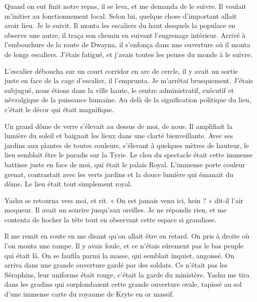 \documentclass{book}
\begin{document}
Quand on eut finit notre repas, il se leva, et me demanda de le suivre. Il voulait m'initier au fonctionnement local. Selon lui, quelque chose d'important allait avoir lieu. Je le suivit. Il monta les escaliers du haut desquels la populace en observe  une autre, il traça son chemin en suivant l'engrenage intérieur. Arrivé à l'embouchure de la route de Dwayna, il s'enfonça dans une ouverture où il monta de longs escaliers. J'étais fatigué, et j'avais toutes les peines du monde à le suivre.\newline

L'escalier déboucha sur un court corridor en arc de cercle, il y avait un sortie juste en face de la cage d'escalier, il l'emprunta. Je m'arrêtai brusquement. J'étais subjugué, nous étions dans la ville haute, le centre administratif, exécutif et névralgique de la puissance humaine. Au delà de la signification politique du lieu, c'était le décor qui était magnifique.\newline

Un grand dôme de verre s'élevait au dessus de moi, de nous. Il amplifiait la lumière du soleil et baignait les lieux dans une clarté bienveillante. Avec ses jardins aux plantes de toutes couleurs, s'élevant à quelques mètres de hauteur, le lieu semblait être le paradis sur la Tyrie. Le clou du spectacle était cette immense battisse juste en face de moi, qui était le palais Royal. L'immense porte couleur grenat, contrastait avec les verts jardins et la douce lumière qui émanait du dôme. Le lieu était tout simplement royal.\newline

Yashu se retourna vers moi, et rit. « On est jamais venu ici, hein ? » dit-il l'air moqueur. Il avait un sourire jusqu'aux oreilles. Je ne répondis rien, et me contenta de hocher la tête tout en observant cette espace si grandiose.\newline

Il me remit en route en me disant qu'on allait être en retard. On pris à droite où l'on monta une rampe. Il y avais foule, et ce n'étais sûrement pas le bas peuple qui était là. On se faufila parmi la masse, qui semblait inquiet, angoissé. On arriva dans une grande ouverture gardé par des soldats. Ce n'était pas les Séraphins, leur uniforme était rouge, c'était la garde du ministère. Yashu me tira dans les gradins qui surplombaient cette grande ouverture ovale, tapissé au sol d'une immense carte du royaume de Kryte en or massif.\newline
\end{document}

